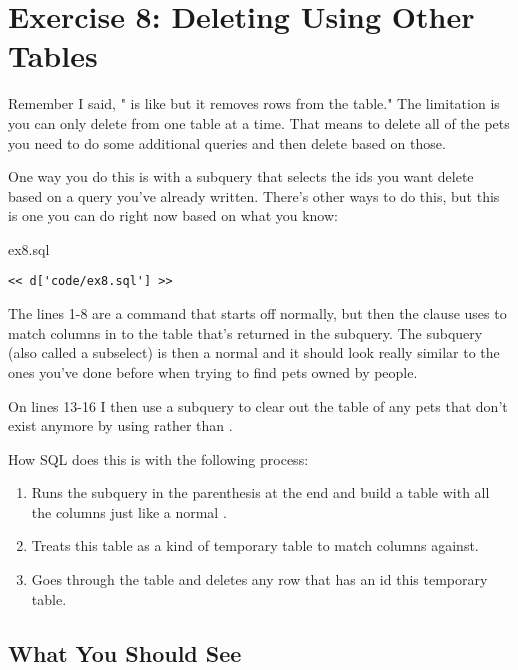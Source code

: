 \chapter{Exercise 8: Deleting Using Other Tables}

Remember I said, " is like  but it removes
rows from the table."  The limitation is you can only delete from one
table at a time.  That means to delete all of the pets you need to do
some additional queries and then delete based on those.

One way you do this is with a subquery that selects the ids you want
delete based on a query you've already written.  There's other ways
to do this, but this is one you can do right now based on what you 
know:

\begin{code}{ex8.sql}
\begin{Verbatim}
<< d['code/ex8.sql'] >>
\end{Verbatim}
\end{code}

The lines 1-8 are a  command that starts off normally, but
then the  clause uses  to match  columns
in  to the table that's returned in the subquery.  The subquery
(also called a subselect) is then a normal  and it should
look really similar to the ones you've done before when trying to find
pets owned by people.

On lines 13-16 I then use a subquery to clear out the 
table of any pets that don't exist anymore by using  rather
than .

How SQL does this is with the following process:

\begin{enumerate}
\item Runs the subquery in the parenthesis at the end and build a table
    with all the columns just like a normal .
\item Treats this table as a kind of temporary table to match 
    columns against.
\item Goes through the  table and deletes any row that has an id
     this temporary table.
\end{enumerate}

\section{What You Should See}

